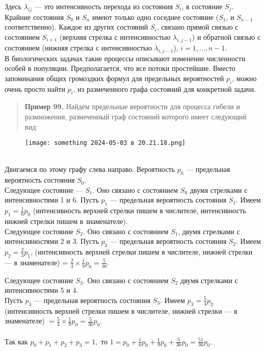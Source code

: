 \documentclass{article}
\begin{document}
Здесь $\lambda_{ij}$ — это интенсивность перехода из состояния $S_i$, в состояние $S_j$. Крайние состояния $S_0$ и $S_n$ имеют только одно соседнее состояние ($S_1$, и $S_{n-1}$ соответственно). Каждое из других состояний $S_i$, связано прямой связью с состоянием $S_{i+1}$ (верхняя стрелка с интенсивностью $\lambda_{i,j-1}$) и обратной связью с состоянием   (нижняя стрелка с интенсивностью $\lambda_{i, j-1}$), $i = 1, ..., n-1$.
\\  \indent
    В биологических задачах такие процессы описывают изменение численности особей в популяции. Предполагается, что все потоки простейшие.  Вместо запоминания общих  громоздких формул для предельных вероятностей $p_i$, можно очень просто найти $p_i$, из размеченного графа состояний для конкретной задачи.
\\ 
\begin{quote}
\textbf{Пример  99.} Найдем предельные вероятности для процесса гибели и размножения, размеченный граф состояний которого имеет следующий вид:
\end{quote}
\begin{figure}[h] 
\centering
\texttt{[image: something 2024-05-03 в 20.21.18.png]}
\label{fig:my_label}
\end{figure} \\


 Двигаемся по этому графу слева направо.  Вероятность $p_0$ — предельная вероятность состояния $S_0$. \\ 
\indent Следующее состояние  —  $S_1$. Оно связано с состоянием $S_0$ двумя стрелками с интенсивностями  1  и 6.  Пусть $p_1$  —  предельная вероятность состояния $S_1$. Имеем $p_1 = \frac{1}{6}p_0$ (интенсивность верхней стрелки пишем в числителе, интенсивность нижней стрелки пишем в знаменателе). \\ \indent
Следующее  состояние $S_2$.  Оно  связано  с  состоянием  $S_1$,  двумя стрелками с  интенсивностями  2  и  3.  Пусть $p_2$ —  предельная вероятность состояния $S_2$.  Имеем $p_2 = \frac{2}{3}p_1$, (интенсивность верхней стрелки пишем в числителе, нижней стрелки — в знаменателе) = $\frac{2}{3}\times\frac{1}{9}p_0 = \frac{5}{36}.$ \\ \indent

Следующее  состояние  $S_3$.  Оно  связано  с  состоянием $S_2$  двумя стрелками с интенсивностями 5  и 4.\\  Пусть $p_3$  — предельная  вероятность состояния $S_3$. Имеем $p_3 = \frac{5}{4}p_2$ (интенсивность верхней стрелки пишем в числителе, нижней стрелки — в знаменателе) $= \frac{5}{4}\times\frac{1}{9}p_0 = \frac{5}{36}p_0.$ \\ 
\\ \indent Так как $p_0 + p_1 + p_2 + p_3 = 1,$
то $1 = p_0 + \frac{1}{6}p_0 + \frac{1}{9}p_0 + \frac{5}{36}p_0 = \frac{51}{36}p_0.$ \\ 
\end{document}
